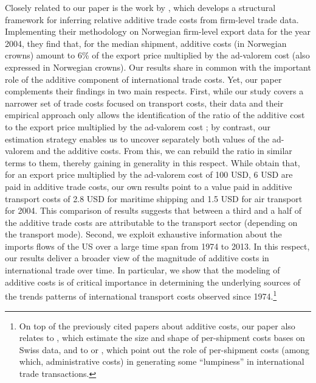 \documentclass[a4paper,11pt]{article}
\begin{document}
Closely related to our paper is the work by \citet{Irrazabal_2015}, which develops a structural framework for inferring relative additive trade costs from firm-level trade data.
Implementing their methodology on Norwegian firm-level export data for the year 2004, they find that, for the median shipment, additive costs (in Norwegian crowns) amount to 6\% of the export price multiplied by the ad-valorem cost (also expressed in Norwegian crowns).
Our results share in common with \citet{Irrazabal_2015} the important role of the additive component of international trade costs.
Yet, our paper complements their findings in two main respects.
First, while our study covers a narrower set of trade costs focused on transport costs, their data and their empirical approach only allows the identification of the ratio of the additive cost to the export price multiplied by the ad-valorem cost ; by contrast, our estimation strategy enables us to uncover separately both values of the ad-valorem and the additive costs.
From this, we can rebuild the ratio in similar terms to them, thereby gaining in generality in this respect.
While \citet{Irrazabal_2015} obtain that, for an export price multiplied by the ad-valorem cost of 100 USD, 6 USD are paid in additive trade costs, our own results point to a value paid in additive transport costs of 2.8 USD for maritime shipping and 1.5 USD for air transport for 2004.
This comparison of results suggests that between a third and a half of the additive trade costs are attributable to the transport sector (depending on the transport mode).
Second, we exploit exhaustive information about the imports flows of the US over a large time span from 1974 to 2013.
In this respect, our results deliver a broader view of the magnitude of additive costs in international trade over time.
In particular, we show that the modeling of additive costs is of critical importance in determining the underlying sources of the trends patterns of international transport costs observed since 1974.\footnote{On top of the previously cited papers about additive costs, our paper also relates to \citet{Kropf-Saure-JIE-2016}, which estimate the size and shape of per-shipment costs bases on Swiss data, and to \citet{Alessandria-et-al-AER-2010} or \citet{Hornok-et-al-JIE-2015, Hornok-et-al-RES-2015}, which point out the role of per-shipment costs (among which, administrative costs) in generating some ``lumpiness'' in international trade transactions.} \smallskip

\end{document}
